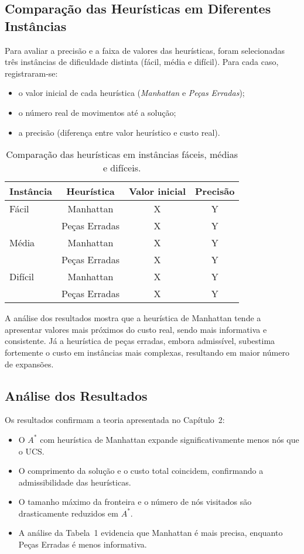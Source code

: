 \subsection{Comparação das Heurísticas em Diferentes Instâncias}  
Para avaliar a precisão e a faixa de valores das heurísticas, foram selecionadas três instâncias de dificuldade distinta (fácil, média e difícil). Para cada caso, registraram-se:  
\begin{itemize}  
    \item o valor inicial de cada heurística (\emph{Manhattan} e \emph{Peças Erradas});  
    \item o número real de movimentos até a solução;  
    \item a precisão (diferença entre valor heurístico e custo real).  
\end{itemize}  
\begin{table}[H]  
\centering  
\caption{Comparação das heurísticas em instâncias fáceis, médias e difíceis.}  
\begin{tabular}{lccc}  
\toprule  
Instância & Heurística & Valor inicial & Precisão \\  
\midrule  
Fácil    & Manhattan     & X & Y \\  
         & Peças Erradas & X & Y \\  
Média    & Manhattan     & X & Y \\  
         & Peças Erradas & X & Y \\  
Difícil  & Manhattan     & X & Y \\  
         & Peças Erradas & X & Y \\  
\bottomrule  
\end{tabular}  
\end{table}  
A análise dos resultados mostra que a heurística de Manhattan tende a apresentar valores mais próximos do custo real, sendo mais informativa e consistente. Já a heurística de peças erradas, embora admissível, subestima fortemente o custo em instâncias mais complexas, resultando em maior número de expansões.  
  
\subsection{Análise dos Resultados}  
Os resultados confirmam a teoria apresentada no Capítulo~2:  
\begin{itemize}  
    \item O $A^*$ com heurística de Manhattan expande significativamente menos nós que o UCS.  
    \item O comprimento da solução e o custo total coincidem, confirmando a admissibilidade das heurísticas.  
    \item O tamanho máximo da fronteira e o número de nós visitados são drasticamente reduzidos em $A^*$.  
    \item A análise da Tabela~1 evidencia que Manhattan é mais precisa, enquanto Peças Erradas é menos informativa.  
\end{itemize}  
  
